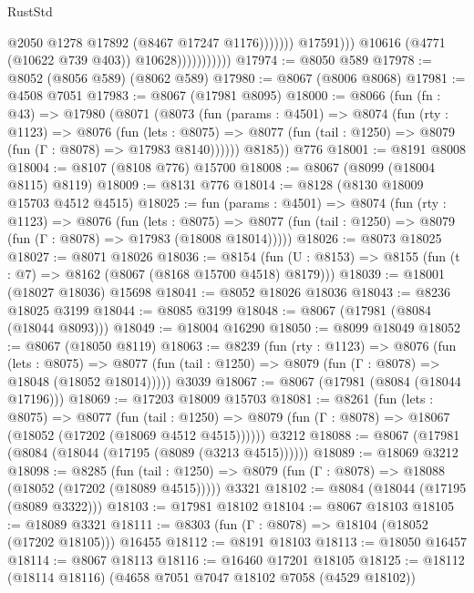 \begin{lexlean}{RustStd}
\begin{coremodule}
                                            @2050
                                            @1278
                                            @17892
                                            (@8467 @17247 @1176)))))))
                                @17591)))
                          @10616
                          (@4771 (@10622 @739 @403))
                          @10628)))))))))))
@17974 := @8050 @589
@17978 := @8052 (@8056 @589) (@8062 @589)
@17980 := @8067 (@8006 @8068)
@17981 := @4508 @7051
@17983 := @8067 (@17981 @8095)
@18000 := @8066
    (fun (fn : @43) =>
    @17980
      (@8071
        (@8073
          (fun (params : @4501) =>
          @8074
            (fun (rty : @1123) =>
            @8076
              (fun (lets : @8075) =>
              @8077 (fun (tail : @1250) => @8079 (fun (Γ : @8078) => @17983 @8140))))))
        @8185))
    @776
@18001 := @8191 @8008
@18004 := @8107 (@8108 @776) @15700
@18008 := @8067 (@8099 (@18004 @8115) @8119)
@18009 := @8131 @776
@18014 := @8128 (@8130 @18009 @15703 @4512 @4515)
@18025 := fun (params : @4501) =>
  @8074
    (fun (rty : @1123) =>
    @8076
      (fun (lets : @8075) =>
      @8077 (fun (tail : @1250) => @8079 (fun (Γ : @8078) => @17983 (@18008 @18014)))))
@18026 := @8073 @18025
@18027 := @8071 @18026
@18036 := @8154
    (fun (U : @8153) => @8155 (fun (t : @7) => @8162 (@8067 (@8168 @15700 @4518) @8179)))
@18039 := @18001 (@18027 @18036) @15698
@18041 := @8052 @18026 @18036
@18043 := @8236 @18025 @3199
@18044 := @8085 @3199
@18048 := @8067 (@17981 (@8084 (@18044 @8093)))
@18049 := @18004 @16290
@18050 := @8099 @18049
@18052 := @8067 (@18050 @8119)
@18063 := @8239
    (fun (rty : @1123) =>
    @8076
      (fun (lets : @8075) =>
      @8077 (fun (tail : @1250) => @8079 (fun (Γ : @8078) => @18048 (@18052 @18014)))))
    @3039
@18067 := @8067 (@17981 (@8084 (@18044 @17196)))
@18069 := @17203 @18009 @15703
@18081 := @8261
    (fun (lets : @8075) =>
    @8077
      (fun (tail : @1250) =>
      @8079 (fun (Γ : @8078) => @18067 (@18052 (@17202 (@18069 @4512 @4515))))))
    @3212
@18088 := @8067 (@17981 (@8084 (@18044 (@17195 (@8089 (@3213 @4515))))))
@18089 := @18069 @3212
@18098 := @8285
    (fun (tail : @1250) => @8079 (fun (Γ : @8078) => @18088 (@18052 (@17202 (@18089 @4515)))))
    @3321
@18102 := @8084 (@18044 (@17195 (@8089 @3322)))
@18103 := @17981 @18102
@18104 := @8067 @18103
@18105 := @18089 @3321
@18111 := @8303 (fun (Γ : @8078) => @18104 (@18052 (@17202 @18105))) @16455
@18112 := @8191 @18103
@18113 := @18050 @16457
@18114 := @8067 @18113
@18116 := @16460 @17201 @18105
@18125 := @18112 (@18114 @18116) (@4658 @7051 @7047 @18102 @7058 (@4529 @18102))

\end{coremodule}
\end{lexlean}
